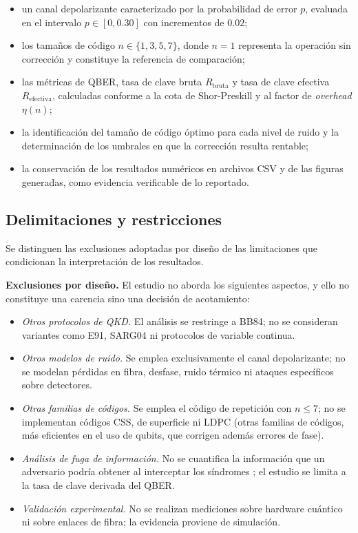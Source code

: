 \documentclass[12pt]{report}
\begin{document}
\begin{itemize}
    \item un canal depolarizante caracterizado por la probabilidad de error $p$,
    evaluada en el intervalo $p \in [0, 0.30]$ con incrementos de $0.02$;
    \item los tamaños de código $n \in \{1, 3, 5, 7\}$, donde $n = 1$ representa
    la operación sin corrección y constituye la referencia de comparación;
    \item las métricas de QBER, tasa de clave bruta $R_{\text{bruta}}$ y tasa de
    clave efectiva $R_{\text{efectiva}}$, calculadas conforme a la cota de
    Shor-Preskill y al factor de \textit{overhead} $\eta(n)$;
    \item la identificación del tamaño de código óptimo para cada nivel de ruido
    y la determinación de los umbrales en que la corrección resulta rentable;
    \item la conservación de los resultados numéricos en archivos CSV y de las
    figuras generadas, como evidencia verificable de lo reportado.
\end{itemize}

\subsection{Delimitaciones y restricciones}

Se distinguen las exclusiones adoptadas por diseño de las limitaciones que
condicionan la interpretación de los resultados.

\textbf{Exclusiones por diseño.} El estudio no aborda los siguientes aspectos, y
ello no constituye una carencia sino una decisión de acotamiento:

\begin{itemize}
    \item \textit{Otros protocolos de QKD.} El análisis se restringe a BB84; no se
    consideran variantes como E91, SARG04 ni protocolos de variable continua.
    \item \textit{Otros modelos de ruido.} Se emplea exclusivamente el canal
    depolarizante; no se modelan pérdidas en fibra, desfase, ruido térmico ni
    ataques específicos sobre detectores.
    \item \textit{Otras familias de códigos.} Se emplea el código de repetición
    con $n \leq 7$; no se implementan códigos CSS, de superficie ni LDPC (otras
    familias de códigos, más eficientes en el uso de qubits, que corrigen además
    errores de fase).
    \item \textit{Análisis de fuga de información.} No se cuantifica la
    información que un adversario podría obtener al interceptar los síndromes
    \citep{matsui2025}; el estudio se limita a la tasa de clave derivada del QBER.
    \item \textit{Validación experimental.} No se realizan mediciones sobre
    hardware cuántico ni sobre enlaces de fibra; la evidencia proviene de
    simulación.
\end{itemize}
\end{document}
